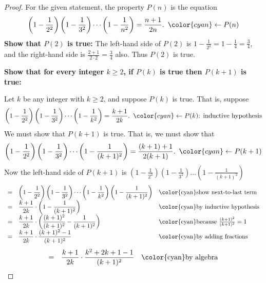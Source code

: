 \documentclass[14pt]{extarticle}
\newcommand{\dps}{\displaystyle}
\newcommand{\from}{\leftarrow}
\newcommand{\cy}{\color{cyan}}
\begin{document}
\begin{proof}
    For the given statement, the property $P(n)$ is the equation
    \[
        \dps \left(1 - \frac{1}{2^2}\right)\left(1 - \frac{1}{3^2}\right) \cdots \left(1 - \frac{1}{n^2}\right) = \frac{n+1}{2n}. \,\,\, {\cy \from P(n)}
    \]
    {\bf Show that $P(2)$ is true:} The left-hand side of $P(2)$ is $\dps 1 - \frac{1}{2^2} = 1 - \frac{1}{4} = \frac{3}{4}$, and the right-hand side is $\dps \frac{2+1}{2 \cdot 2} = \frac{3}{4}$ also. Thus $P(2)$ is true.

        {\bf Show that for every integer $k \geq 2$, if $P(k)$ is true then $P(k + 1)$ is true:}

    Let $k$ be any integer with $k \geq 2$, and suppose $P(k)$ is true. That is, suppose
    \[
        \dps \left(1 - \frac{1}{2^2}\right)\left(1 - \frac{1}{3^2}\right) \cdots \left(1 - \frac{1}{k^2}\right) = \frac{k+1}{2k}. \,\,\, {\cy \from P(k) \text{: inductive hypothesis}}
    \]
    We must show that $P(k + 1)$ is true. That is, we must show that
    \[
        \dps \left(1 - \frac{1}{2^2}\right)\left(1 - \frac{1}{3^2}\right) \cdots \left(1 - \frac{1}{(k+1)^2}\right) = \frac{(k+1)+1}{2(k+1)}. \,\,\,{\cy \from P(k+1)}
    \]
    Now the left-hand side of $P(k + 1)$ is $\dps \left(1 - \frac{1}{2^2}\right)\left(1 - \frac{1}{3^2}\right) \ldots \left(1 - \frac{1}{(k+1)^2}\right)$
    \[
        \begin{array}{lll}
            = & \dps \left(1 - \frac{1}{2^2}\right)\left(1 - \frac{1}{3^2}\right) \cdots \left(1 - \frac{1}{k^2}\right) \left(1 - \frac{1}{(k+1)^2}\right) & \text{\cy show next-to-last term}                \\
            = & \dps \frac{k+1}{2k} \cdot \left(1 - \frac{1}{(k+1)^2}\right)                                                                               & \text{\cy by inductive hypothesis}               \\
            = & \dps \frac{k+1}{2k} \cdot \left(\frac{(k+1)^2}{(k+1)^2} - \frac{1}{(k+1)^2}\right)                                                         & \text{\cy because $\frac{(k+1)^2}{(k+1)^2} = 1$} \\
            = & \dps \frac{k+1}{2k} \cdot \frac{(k+1)^2 - 1}{(k+1)^2}                                                                                      & \text{\cy by adding fractions}
        \end{array}
    \]
    \[
        \begin{array}{lll}
            = & \dps \frac{k+1}{2k} \cdot \frac{k^2+2k+1 - 1}{(k+1)^2} & \text{\cy by algebra}               \\

\end{array}\]
\end{proof}
\end{document}
